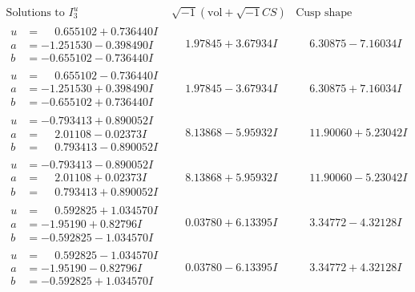 \documentclass[1p]{elsarticle_modified}
\theoremstyle{definition}
\newcommand{\I}{\sqrt{-1}}
\begin{document}
$$\begin{array}{c|c|c}  
\text{Solutions to }I^u_{3}& \I (\text{vol} + \sqrt{-1}CS) & \text{Cusp shape}\\
 \hline 
\begin{aligned}
u &= \phantom{-}0.655102 + 0.736440 I \\
a &= -1.251530 - 0.398490 I \\
b &= -0.655102 - 0.736440 I\end{aligned}
 & \phantom{-}1.97845 + 3.67934 I & \phantom{-}6.30875 - 7.16034 I \\ \hline\begin{aligned}
u &= \phantom{-}0.655102 - 0.736440 I \\
a &= -1.251530 + 0.398490 I \\
b &= -0.655102 + 0.736440 I\end{aligned}
 & \phantom{-}1.97845 - 3.67934 I & \phantom{-}6.30875 + 7.16034 I \\ \hline\begin{aligned}
u &= -0.793413 + 0.890052 I \\
a &= \phantom{-}2.01108 - 0.02373 I \\
b &= \phantom{-}0.793413 - 0.890052 I\end{aligned}
 & \phantom{-}8.13868 - 5.95932 I & \phantom{-}11.90060 + 5.23042 I \\ \hline\begin{aligned}
u &= -0.793413 - 0.890052 I \\
a &= \phantom{-}2.01108 + 0.02373 I \\
b &= \phantom{-}0.793413 + 0.890052 I\end{aligned}
 & \phantom{-}8.13868 + 5.95932 I & \phantom{-}11.90060 - 5.23042 I \\ \hline\begin{aligned}
u &= \phantom{-}0.592825 + 1.034570 I \\
a &= -1.95190 + 0.82796 I \\
b &= -0.592825 - 1.034570 I\end{aligned}
 & \phantom{-}0.03780 + 6.13395 I & \phantom{-}3.34772 - 4.32128 I \\ \hline\begin{aligned}
u &= \phantom{-}0.592825 - 1.034570 I \\
a &= -1.95190 - 0.82796 I \\
b &= -0.592825 + 1.034570 I\end{aligned}
 & \phantom{-}0.03780 - 6.13395 I & \phantom{-}3.34772 + 4.32128 I \\ \hline\begin{aligned}

\end{aligned}
\end{array}$$
\end{document}
